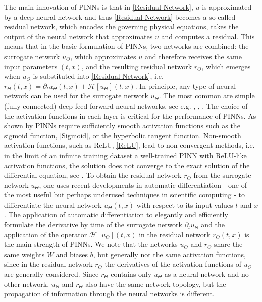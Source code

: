 The main innovation of PINNs is that in \cref{Residual Network}, $u$ is approximated by a deep neural network and thus \cref{Residual Network} becomes a so-called residual network, which encodes the governing physical equations, takes the output of the neural network that approximates $u$ and computes a residual. This means that in the basic formulation of PINNs, two networks are combined: the surrogate network $u_\Theta$, which approximates $u$ and therefore receives the same input parameters $(t,x)$, and the resulting residual network $r_\Theta$, which emerges when $u_\Theta$ is substituted into \cref{Residual Network}, i.e. $r_\Theta(t,x) = \partial_t u_\Theta (t,x) + \mathcal{H} \left[ u_\Theta \right] (t, x)$. In principle, any type of neural network can be used for the surrogate network $u_\Theta$. The most common are simple (fully-connected) deep feed-forward neural networks, see e.g. \cite{RaissiPerdikarisKarniadakis:2019}, \cite{BlechschmidtErnst:2021}, \cite{Markidis:2021}. The choice of the activation functions in each layer is critical for the performance of PINNs. As shown by \cite{MishraMolinaro:2021} PINNs require sufficiently smooth activation functions such as the sigmoid function, \cref{Sigmoid}, or the hyperbolic tangent function. Non-smooth activation functions, such as ReLU, \cref{ReLU}, lead to non-convergent methods, i.e. in the limit of an infinite training dataset a well-trained PINN with ReLU-like activation functions, the solution does not converge to the exact solution of the differential equation, see \cite{MishraMolinaro:2021}. To obtain the residual network $r_\Theta$ from the surrogate network $u_\Theta$, one uses recent developments in automatic differentiation - one of the most useful but perhaps underused techniques in scientific computing - to differentiate the neural network $u_\Theta(t,x)$ with respect to its input values $t$ and $x$. The application of automatic differentiation to elegantly and efficiently formulate the derivative by time of the surrogate network $\partial_t u_\Theta$ and the application of the operator $\mathcal{H} \left[ u_\Theta \right] (t,x)$ in the residual network $r_\Theta(t,x)$ is the main strength of PINNs. We note that the networks $u_\Theta$ and $r_\Theta$ share the same weights $W$ and biases $b$, but generally not the same activation functions, since in the residual network $r_\Theta$ the derivatives of the activation functions of $u_\Theta$ are generally considered. Since $r_\Theta$ contains only $u_\Theta$ as a neural network and no other network, $u_\Theta$ and $r_\Theta$ also have the same network topology, but the propagation of information through the neural networks is different. \\

